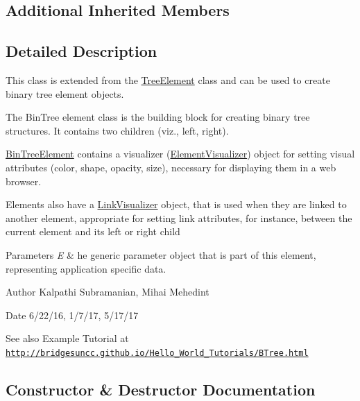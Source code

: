 \subsection*{Additional Inherited Members}


\subsection{Detailed Description}
This class is extended from the \hyperlink{classbridges_1_1base_1_1_tree_element}{Tree\+Element} class and can be used to create binary tree element objects. 

The Bin\+Tree element class is the building block for creating binary tree structures. It contains two children (viz., left, right).

\hyperlink{classbridges_1_1base_1_1_bin_tree_element}{Bin\+Tree\+Element} contains a visualizer (\hyperlink{classbridges_1_1base_1_1_element_visualizer}{Element\+Visualizer}) object for setting visual attributes (color, shape, opacity, size), necessary for displaying them in a web browser.

Elements also have a \hyperlink{classbridges_1_1base_1_1_link_visualizer}{Link\+Visualizer} object, that is used when they are linked to another element, appropriate for setting link attributes, for instance, between the current element and its left or right child


\begin{DoxyParams}{Parameters}
{\em E} & he generic parameter object that is part of this element, representing application specific data.\\
\hline
\end{DoxyParams}
\begin{DoxyAuthor}{Author}
Kalpathi Subramanian, Mihai Mehedint
\end{DoxyAuthor}
\begin{DoxyDate}{Date}
6/22/16, 1/7/17, 5/17/17
\end{DoxyDate}
\begin{DoxySeeAlso}{See also}
Example Tutorial at ~\newline
 \href{http://bridgesuncc.github.io/Hello_World_Tutorials/BTree.html}{\tt http\+://bridgesuncc.\+github.\+io/\+Hello\+\_\+\+World\+\_\+\+Tutorials/\+B\+Tree.\+html} 
\end{DoxySeeAlso}


\subsection{Constructor \& Destructor Documentation}
\hypertarget{classbridges_1_1base_1_1_bin_tree_element_ad6dbf38d53a78be561039c46bde8bc47}{}\label{classbridges_1_1base_1_1_bin_tree_element_ad6dbf38d53a78be561039c46bde8bc47} 
